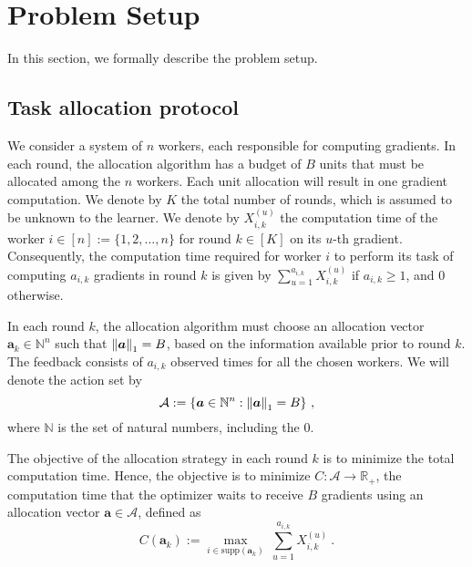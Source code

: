 \section{Problem Setup}
\label{sec:setup}

In this section, we formally describe the problem setup.


\subsection{Task allocation protocol}
We consider a system of $n$ workers, each responsible for computing gradients.
In each round, the allocation algorithm has a budget of $B$ units that must be allocated among the $n$ workers.
Each unit allocation will result in one gradient computation.
We denote by $K$ the total number of rounds, which is assumed to be unknown to the learner.
We denote by $X_{i,k}^{(u)}$ the computation time of the worker $i \in [n]:=\{1, 2, \dots, n\}$ for round $k \in [K]$ on its $u$-th gradient.
Consequently, the computation time required for worker $i$ to perform its task of computing $a_{i,k}$ gradients in round $k$ is given by $\sum_{u=1}^{a_{i,k}} X_{i,k}^{(u)}$ if $a_{i,k} \geq 1$, and $0$ otherwise.

In each round $k$, the allocation algorithm must choose an allocation vector $\bm{a}_k \in \mathbb{N}^n$ such that $\left\| \bm{a} \right\|_1 = B$, based on the information available prior to round $k$.
The feedback consists of $a_{i,k}$ observed times for all the chosen workers.
We will denote the action set by 
$$
\mathcal{A} := \{ \bm{a} \in \mathbb{N}^n : \left\| \bm{a} \right\|_1 = B \}~,
$$
where $\mathbb{N}$ is the set of natural numbers, including the $0$.

The objective of the allocation strategy in each round $k$ is to minimize the total computation time.
Hence, the objective is to minimize $C : \mathcal{A} \to \mathbb{R}_+$, the computation time that the optimizer waits to receive $B$ gradients using an allocation vector $\bm{a} \in \mathcal{A}$, defined as
\begin{equation}\label{eq:def_c}
	C(\bm{a}_k)
	:= \max_{i\in \text{supp}(\bm{a}_k)} \  \sum_{u=1}^{a_{i,k}} X_{i,k}^{(u)}~.
\end{equation}




